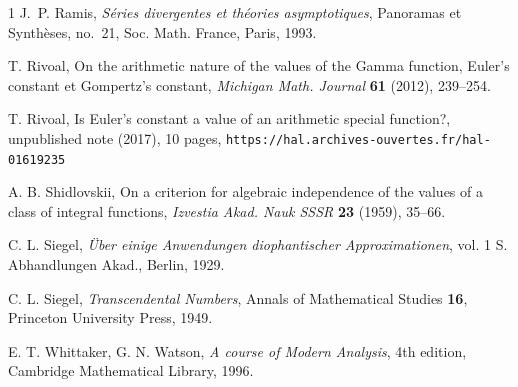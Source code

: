\documentclass[reqno,12pt]{article}
\numberwithin{equation}{section}
\theoremstyle{remark}
\begin{document}
\begin{thebibliography}{1}
 J.~P. Ramis, {\em S\'eries divergentes et th\'eories
  asymptotiques}, Panoramas et Synth\`eses, no.~21, Soc. Math. France, Paris,
  1993.

 T. Rivoal, { On the arithmetic nature of the values of the Gamma function, Euler's constant et Gompertz's constant}, {\em  Michigan Math. Journal} {\bf 61} (2012),  239--254.

 T. Rivoal,  Is Euler's constant a value of an arithmetic special function?, unpublished note (2017), 10 pages, {\tt https://hal.archives-ouvertes.fr/hal-01619235}

 A. B. Shidlovskii, {On a criterion for algebraic independence of the values of a class of integral functions}, {\em Izvestia Akad. Nauk SSSR} {\bf 23} (1959), 35--66.


 C. L. Siegel, {\em \"Uber einige Anwendungen diophantischer Approximationen}, vol. 1 S. Abhand\-lungen Akad., Berlin, 1929.

 C. L. Siegel, {\em Transcendental Numbers}, Annals of Mathematical Studies {\bf 16}, Princeton University Press, 1949.

 E. T. Whittaker, G. N. Watson, {\em A course of Modern Analysis}, 4th edition, Cambridge Mathematical Library, 1996.

\end{thebibliography}
\end{document}
